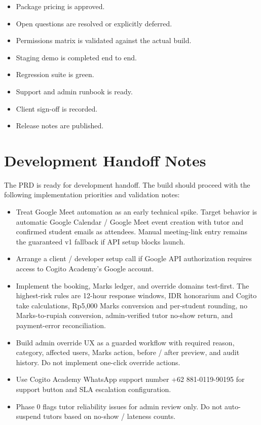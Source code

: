 \documentclass[11pt,a4paper]{article}
\begin{document}
\begin{itemize}
    \item Package pricing is approved.
    \item Open questions are resolved or explicitly deferred.
    \item Permissions matrix is validated against the actual build.
    \item Staging demo is completed end to end.
    \item Regression suite is green.
    \item Support and admin runbook is ready.
    \item Client sign-off is recorded.
    \item Release notes are published.
\end{itemize}

\section{Development Handoff Notes}

The PRD is ready for development handoff. The build should proceed with the following implementation priorities and validation notes:

\begin{itemize}
    \item Treat Google Meet automation as an early technical spike. Target behavior is automatic Google Calendar / Google Meet event creation with tutor and confirmed student emails as attendees. Manual meeting-link entry remains the guaranteed v1 fallback if API setup blocks launch.
    \item Arrange a client / developer setup call if Google API authorization requires access to Cogito Academy's Google account.
    \item Implement the booking, Marks ledger, and override domains test-first. The highest-risk rules are 12-hour response windows, IDR honorarium and Cogito take calculations, Rp5,000 Marks conversion and per-student rounding, no Marks-to-rupiah conversion, admin-verified tutor no-show return, and payment-error reconciliation.
    \item Build admin override UX as a guarded workflow with required reason, category, affected users, Marks action, before / after preview, and audit history. Do not implement one-click override actions.
    \item Use Cogito Academy WhatsApp support number +62 881-0119-90195 for support button and SLA escalation configuration.
    \item Phase 0 flags tutor reliability issues for admin review only. Do not auto-suspend tutors based on no-show / lateness counts.
\end{itemize}
\end{document}
